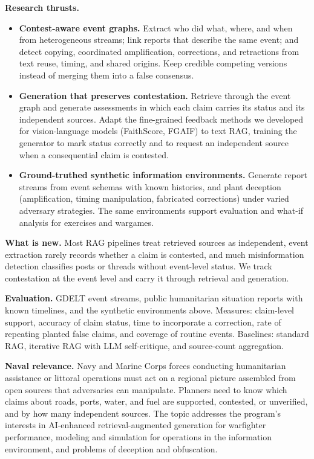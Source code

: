 \documentclass[11pt]{article}
\newcommand{\head}[1]{{\color{navy}\textbf{#1}}\enspace}
\begin{document}
\head{Research thrusts.}
\begin{itemize}
\item \textbf{Contest-aware event graphs.} Extract who did what, where, and when from heterogeneous streams; link reports that describe the same event; and detect copying, coordinated amplification, corrections, and retractions from text reuse, timing, and shared origins. Keep credible competing versions instead of merging them into a false consensus.
\item \textbf{Generation that preserves contestation.} Retrieve through the event graph and generate assessments in which each claim carries its status and its independent sources. Adapt the fine-grained feedback methods we developed for vision-language models (FaithScore, FGAIF) to text RAG, training the generator to mark status correctly and to request an independent source when a consequential claim is contested.
\item \textbf{Ground-truthed synthetic information environments.} Generate report streams from event schemas with known histories, and plant deception (amplification, timing manipulation, fabricated corrections) under varied adversary strategies. The same environments support evaluation and what-if analysis for exercises and wargames.
\end{itemize}

\head{What is new.} Most RAG pipelines treat retrieved sources as independent, event extraction rarely records whether a claim is contested, and much misinformation detection classifies posts or threads without event-level status. We track contestation at the event level and carry it through retrieval and generation.

\head{Evaluation.} GDELT event streams, public humanitarian situation reports with known timelines, and the synthetic environments above. Measures: claim-level support, accuracy of claim status, time to incorporate a correction, rate of repeating planted false claims, and coverage of routine events. Baselines: standard RAG, iterative RAG with LLM self-critique, and source-count aggregation.

\head{Naval relevance.} Navy and Marine Corps forces conducting humanitarian assistance or littoral operations must act on a regional picture assembled from open sources that adversaries can manipulate. Planners need to know which claims about roads, ports, water, and fuel are supported, contested, or unverified, and by how many independent sources. The topic addresses the program's interests in AI-enhanced retrieval-augmented generation for warfighter performance, modeling and simulation for operations in the information environment, and problems of deception and obfuscation.
\end{document}
